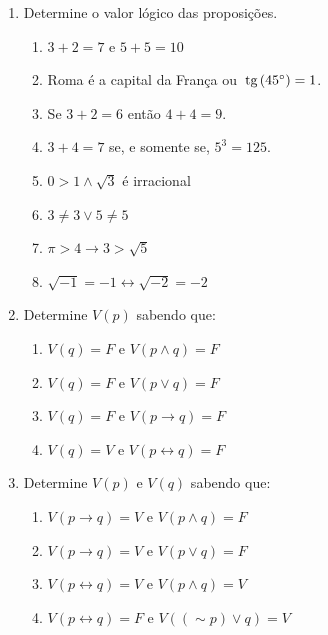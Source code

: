 \documentclass[a4paper,5pt]{amsbook}
\newcommand{\tg}{\,\mbox{tg}\,}
\renewcommand{\lnot}{\sim}
\begin{document}
\begin{enumerate}
    \vspace{0.5cm}
    \item Determine o valor l\'ogico das proposi\c{c}\~oes.
        \begin{enumerate}
            \item $3+2=7$ e $5+5=10$
            \item Roma \'e a capital da Fran\c{c}a ou $\tg(45\degree)=1$.
            \item Se $3+2=6$ ent\~ao $4+4=9$.
            \item $3+4=7$ se, e somente se, $5^3=125$.
            \item $0>1 \land \sqrt{3}$ \'e irracional
            \item $3\neq 3 \lor 5\neq 5$
            \item $\pi > 4 \rightarrow 3> \sqrt{5}$
            \item $\sqrt{-1}=-1 \leftrightarrow \sqrt{-2}=-2$
        \end{enumerate}

    \vspace{0.5cm}
    \item Determine $V(p)$ sabendo que:
        \begin{enumerate}
            \item $V(q)=F$ e $V(p\land q)=F$
            \item $V(q)=F$ e $V(p\lor q)=F$
            \item $V(q)=F$ e $V(p\rightarrow q)=F$
            \item $V(q)=V$ e $V(p\leftrightarrow q)=F$
        \end{enumerate}

    \vspace{0.5cm}
    \item Determine $V(p)$ e $V(q)$ sabendo que:
        \begin{enumerate}
            \item $V(p\rightarrow q)=V$ e $V(p\land q)=F$
            \item $V(p\rightarrow q)=V$ e $V(p\lor q)=F$
            \item $V(p\leftrightarrow q)=V$ e $V(p\land q)=V$
            \item $V(p\leftrightarrow q)=F$ e $V((\lnot p)\lor q)=V$
        \end{enumerate}

\end{enumerate}
\end{document}
